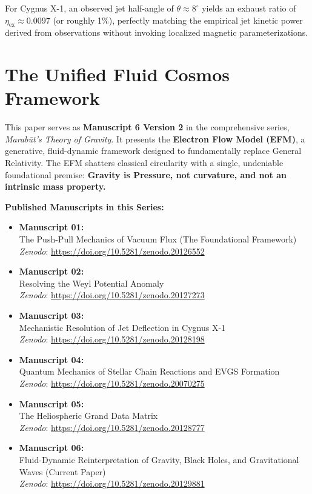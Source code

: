 \documentclass[11pt, a4paper]{article}
\begin{document}
For Cygnus X-1, an observed jet half-angle of $\theta \approx 8^\circ$ yields an exhaust ratio of $\eta_{\text{ex}} \approx 0.0097$ (or roughly 1\%), perfectly matching the empirical jet kinetic power derived from observations without invoking localized magnetic parameterizations.

\clearpage
\section*{The Unified Fluid Cosmos Framework}
  This paper serves as \textbf{Manuscript 6 Version 2} in the comprehensive series, \textit{Marab\={u}t's Theory of Gravity}. It presents the \textbf{Electron Flow Model (EFM)}, a generative, fluid-dynamic framework designed to fundamentally replace General Relativity. The EFM shatters classical circularity with a single, undeniable foundational premise: \textbf{Gravity is Pressure, not curvature, and not an intrinsic mass property.}

  \vspace{1em}
  \noindent \textbf{Published Manuscripts in this Series:}
  \begin{itemize}
    \item \textbf{Manuscript 01:} \\ The Push-Pull Mechanics of Vacuum Flux (The Foundational Framework) \\ \textit{Zenodo}: \url{https://doi.org/10.5281/zenodo.20126552}
    
    \item \textbf{Manuscript 02:} \\ Resolving the Weyl Potential Anomaly \\ \textit{Zenodo}: \url{https://doi.org/10.5281/zenodo.20127273}

    \item \textbf{Manuscript 03:} \\ Mechanistic Resolution of Jet Deflection in Cygnus X-1 \\ \textit{Zenodo}: \url{https://doi.org/10.5281/zenodo.20128198}

    \item \textbf{Manuscript 04:} \\ Quantum Mechanics of Stellar Chain Reactions and EVGS Formation \\ \textit{Zenodo}: \url{https://doi.org/10.5281/zenodo.20070275}

    \item \textbf{Manuscript 05:} \\ The Heliospheric Grand Data Matrix \\ \textit{Zenodo}: \url{https://doi.org/10.5281/zenodo.20128777}

    \item \textbf{Manuscript 06:} \\ Fluid-Dynamic Reinterpretation of Gravity, Black Holes, and Gravitational Waves (Current Paper) \\ \textit{Zenodo}: \url{https://doi.org/10.5281/zenodo.20129881}
  \end{itemize}
\end{document}
